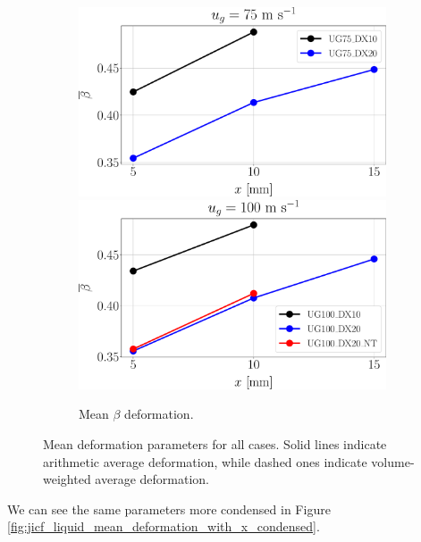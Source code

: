 \begin{figure}[ht]
\begin{subfigure}[b]{1.0\textwidth}
	\flushleft
   \includegraphics[scale=0.225]{./part2_developments/figures_ch5_resolved_JICF/SPRAY_characterization/deformation/ug75_beta_mean}
   \hfill
   \includegraphics[scale=0.225]{./part2_developments/figures_ch5_resolved_JICF/SPRAY_characterization/deformation/ug100_beta_mean}
	\caption{Mean $\beta$ deformation.}
\end{subfigure}

   \caption[Sampled mean deformation parameters for all cases]{Mean deformation parameters for all cases. Solid lines indicate arithmetic average deformation, while dashed ones indicate volume-weighted average deformation.}
\label{fig:jicf_liquid_mean_deformation_with_x}
\end{figure}


We can see the same parameters more condensed in Figure \ref{fig:jicf_liquid_mean_deformation_with_x_condensed}.


